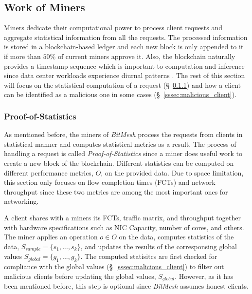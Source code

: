 \documentclass[11px]{article}
\newcommand{\projTitle}{BitMesh\xspace}
\begin{document}
\subsection{Work of Miners}\label{ssec:work_of_miners}
Miners dedicate their computational power to process client requests and aggregate statistical information from all the requests. The processed information is stored in a blockchain-based ledger and each new block is only appended to it if more than $50\%$ of current miners approve it. Also, the blockchain naturally provides a timestamp sequence which is important to computation and inference since data center workloads experience diurnal patterns \cite{diurnal_pattern_data_center_1, diurnal_pattern_data_center_2}. The rest of this section will focus on the statistical computation of a request (\S\ \ref{sssec:proof_of_statistics}) and how a client can be identified as a malicious one in some cases (\S\ \ref{sssec:malicious_client}).

\subsubsection{Proof-of-Statistics}\label{sssec:proof_of_statistics}
As mentioned before, the miners of \textit{\projTitle} process the requests from clients in statistical manner and computes statistical metrics as a result. The process of handling a request is called \textit{Proof-of-Statistics} since a miner does useful work to create a new block of the blockchain. Different statistics can be  computed on different performance metrics, $O$, on the provided data. Due to space limitation, this section only focuses on flow completion times (FCTs) and network throughput since these two metrics are among the most important ones for networking.

\noindent \newline A client shares with a miners its FCTs, traffic matrix, and throughput together with hardware specifications such as NIC Capacity, number of cores, and others. The miner applies an operation $o \in O$ on the data, computes statistics of the data, $S_{sample} = \{s_1, ..., s_k\}$, and updates the results of the corresponsing global values $S_{global} = \{g_1, ..., g_k\}$.
The computed statisitcs are first checked for compliance with the global values (\S\ \ref{sssec:malicious_client}) to filter out malicious clients before updating the global values, $S_{global}$. However, as it has been mentioned before, this step is optional since \textit{\projTitle} assumes honest clients.
\end{document}
